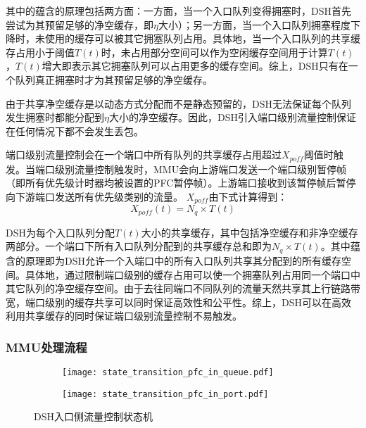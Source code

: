 其中的蕴含的原理包括两方面：一方面，当一个入口队列变得拥塞时，DSH首先尝试为其预留足够的净空缓存，即$\eta$大小）；另一方面，当一个入口队列拥塞程度下降时，未使用的缓存可以被其它拥塞队列占用。具体地，当一个入口队列的共享缓存占用小于阈值$T(t)$时，未占用部分空间可以作为空闲缓存空间用于计算$T(t)$，$T(t)$增大即表示其它拥塞队列可以占用更多的缓存空间。综上，DSH只有在一个队列真正拥塞时才为其预留足够的净空缓存。

由于共享净空缓存是以动态方式分配而不是静态预留的，DSH无法保证每个队列发生拥塞时都能分配到$\eta$大小的净空缓存。因此，DSH引入端口级别流量控制保证在任何情况下都不会发生丢包。

端口级别流量控制会在一个端口中所有队列的共享缓存占用超过$X_{\mathit{poff}}$阈值时触发。当端口级别流量控制触发时，MMU会向上游端口发送一个端口级别暂停帧（即所有优先级计时器均被设置的PFC暂停帧）。上游端口接收到该暂停帧后暂停向下游端口发送所有优先级类别的流量。
$X_{\mathit{poff}}$由下式计算得到：
\begin{equation}
  X_{\mathit{poff}}(t) = N_q \times T(t)
  \label{eqn:c3:port pause threshold}
\end{equation}

DSH为每个入口队列分配$T(t)$大小的共享缓存，其中包括净空缓存和非净空缓存两部分。一个端口下所有入口队列分配到的共享缓存总和即为$N_q \times T(t)$。其中蕴含的原理即为DSH允许一个入端口中的所有入口队列共享其分配到的所有缓存空间。具体地，通过限制端口级别的缓存占用可以使一个拥塞队列占用同一个端口中其它队列的净空缓存空间。由于去往同端口不同队列的流量天然共享其上行链路带宽，端口级别的缓存共享可以同时保证高效性和公平性。综上，DSH可以在高效利用共享缓存的同时保证端口级别流量控制不易触发。

\subsubsection{MMU处理流程}

\begin{figure}[H]
  \begin{subfigure}[b]{0.49\linewidth}
      \centering
      \texttt{[image: state\_transition\_pfc\_in\_queue.pdf]}
      \label{c3:s3:ss4:fig:sub1:dsh ingress queue state transition}
  \end{subfigure}
  \begin{subfigure}[b]{0.49\linewidth}
      \centering
      \texttt{[image: state\_transition\_pfc\_in\_port.pdf]}
      \label{c3:s3:ss4:fig:sub2:dsh ingress port state transition}
  \end{subfigure}
  \caption{DSH入口侧流量控制状态机}
  \label{c3:s3:ss4:fig:dsh ingress state transition}
\end{figure}

